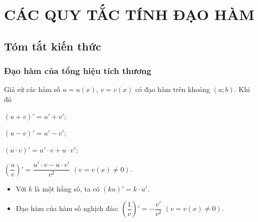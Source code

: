 \setcounter{dang}{0}
\section{CÁC QUY TẮC TÍNH ĐẠO HÀM}
\subsection{Tóm tắt kiến thức}
\subsubsection{Đạo hàm của tổng hiệu tích thương}
\begin{dl}
Giả sử các hàm số $u=u(x)$, $v=v(x)$ có đạo hàm trên khoảng $\left(a;b\right)$. Khi đó
\begin{enumEX}[\itemCI]{2}
	\item $\left(u+v\right)'=u'+v'$;	
	\item $\left(u-v\right)'=u'-v'$;
	\item $\left(u\cdot v\right)'=u'\cdot v+u\cdot v'$;	
	\item $\left(\dfrac{u}{v}\right)'=\dfrac{u'\cdot v-u\cdot v'}{v^2}$ $\left(v=v(x)\neq 0\right)$. 
\end{enumEX}
\end{dl}
\begin{note}
	\begin{itemize}
	\item Với $k$ là một hằng số, ta có $\left(ku\right)'=k\cdot u'$.
	\item Đạo hàm của hàm số nghịch đảo: $\left(\dfrac{1}{v}\right)'=-\dfrac{v'}{v^2}$ $\left(v=v(x)\neq 0\right)$.
	\end{itemize}
\end{note}
